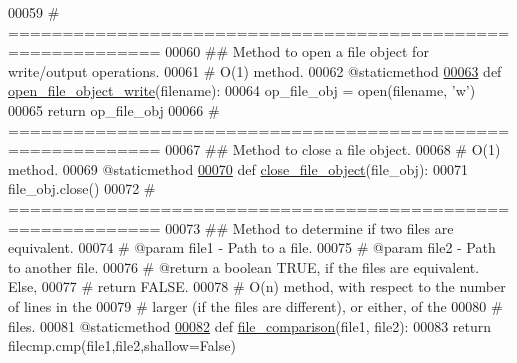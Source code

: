 \begin{DoxyCode}
00059     \textcolor{comment}{# ============================================================}
00060     \textcolor{comment}{##  Method to open a file object for write/output operations.}
00061     \textcolor{comment}{#   O(1) method.}
00062     @staticmethod
\hypertarget{file__io_8py_source_l00063}{}\hyperlink{classutilities_1_1file__io_1_1file__io__operations_aaf94e26da1d988ece479d1600ad1de4a}{00063}     \textcolor{keyword}{def }\hyperlink{classutilities_1_1file__io_1_1file__io__operations_aaf94e26da1d988ece479d1600ad1de4a}{open\_file\_object\_write}(filename):
00064         op\_file\_obj = open(filename, \textcolor{stringliteral}{'w'})
00065         \textcolor{keywordflow}{return} op\_file\_obj
00066     \textcolor{comment}{# ============================================================}
00067     \textcolor{comment}{##  Method to close a file object.}
00068     \textcolor{comment}{#   O(1) method.}
00069     @staticmethod
\hypertarget{file__io_8py_source_l00070}{}\hyperlink{classutilities_1_1file__io_1_1file__io__operations_a15cce5bd7767b057cdc569f393c24866}{00070}     \textcolor{keyword}{def }\hyperlink{classutilities_1_1file__io_1_1file__io__operations_a15cce5bd7767b057cdc569f393c24866}{close\_file\_object}(file\_obj):
00071         file\_obj.close()
00072     \textcolor{comment}{# ============================================================}
00073     \textcolor{comment}{##  Method to determine if two files are equivalent.}
00074     \textcolor{comment}{#   @param file1 - Path to a file.}
00075     \textcolor{comment}{#   @param file2 - Path to another file.}
00076     \textcolor{comment}{#   @return a boolean TRUE, if the files are equivalent. Else,}
00077     \textcolor{comment}{#       return FALSE.}
00078     \textcolor{comment}{#   O(n) method, with respect to the number of lines in the}
00079     \textcolor{comment}{#       larger (if the files are different), or either, of the}
00080     \textcolor{comment}{#       files.}
00081     @staticmethod
\hypertarget{file__io_8py_source_l00082}{}\hyperlink{classutilities_1_1file__io_1_1file__io__operations_a9b3808ff6b165f5e73b780036f73a917}{00082}     \textcolor{keyword}{def }\hyperlink{classutilities_1_1file__io_1_1file__io__operations_a9b3808ff6b165f5e73b780036f73a917}{file\_comparison}(file1, file2):
00083         \textcolor{keywordflow}{return} filecmp.cmp(file1,file2,shallow=\textcolor{keyword}{False})
\end{DoxyCode}
